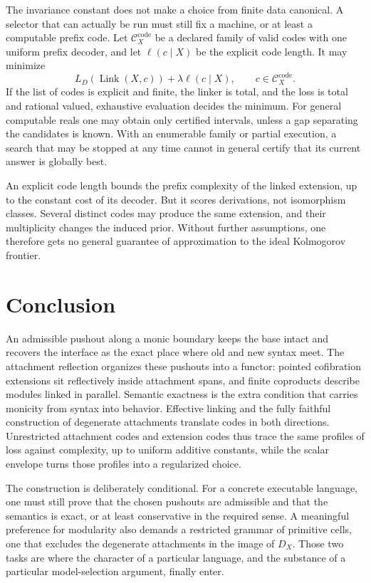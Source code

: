 \documentclass[11pt]{article}
\begin{document}
The invariance constant does not make a choice from finite data canonical.  A
selector that can actually be run must still fix a machine, or at least a
computable prefix code.  Let
\(\mathcal C_X^{\mathrm{code}}\) be a declared family of valid codes with one
uniform prefix decoder, and let \(\ell(c\mid X)\) be the explicit code length.
It may minimize
\[
 L_D(\operatorname{Link}(X,c))+\lambda\ell(c\mid X),
 \qquad c\in\mathcal C_X^{\mathrm{code}}.
\]
If the list of codes is explicit and finite, the linker is total, and the loss
is total and rational valued, exhaustive evaluation decides the minimum.  For
general computable reals one may obtain only certified intervals, unless a gap
separating the candidates is known.  With an enumerable family or partial
execution, a search that may be stopped at any time cannot in general certify
that its current answer is globally best.

An explicit code length bounds the prefix complexity of the linked extension,
up to the constant cost of its decoder.  But it scores derivations, not
isomorphism classes.  Several distinct codes may produce the same extension,
and their multiplicity changes the induced prior.  Without further assumptions,
one therefore gets no general guarantee of approximation to the ideal
Kolmogorov frontier.

\section{Conclusion}

An admissible pushout along a monic boundary keeps the base intact and recovers
the interface as the exact place where old and new syntax meet.  The attachment
reflection organizes these pushouts into a functor: pointed cofibration
extensions sit reflectively inside attachment spans, and finite coproducts
describe modules linked in parallel.  Semantic exactness is the extra
condition that carries monicity from syntax into behavior.  Effective linking
and the fully faithful construction of degenerate attachments translate codes
in both directions.  Unrestricted attachment codes and extension codes thus
trace the same profiles of loss against complexity, up to uniform additive
constants, while the scalar envelope turns those profiles into a regularized
choice.

The construction is deliberately conditional.  For a concrete executable
language, one must still prove that the chosen pushouts are admissible and that
the semantics is exact, or at least conservative in the required sense.  A
meaningful preference for modularity also demands a restricted grammar of
primitive cells, one that excludes the degenerate attachments in the image of
\(D_X\).  Those two tasks are where the character of a particular language,
and the substance of a particular model-selection argument, finally enter.


{\small


}
\end{document}

